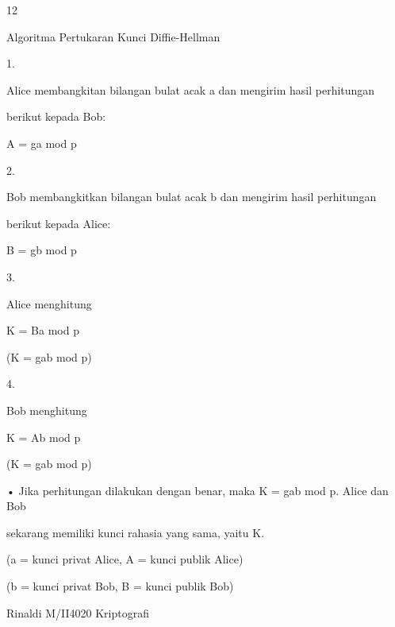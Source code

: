 \documentclass{article}
\begin{document}

12

Algoritma Pertukaran Kunci Diffie-Hellman

1.

Alice membangkitan bilangan bulat acak a  dan mengirim hasil perhitungan 

berikut kepada Bob:



A = ga mod p

2.

Bob membangkitkan bilangan bulat acak b dan mengirim hasil perhitungan 

berikut kepada Alice:



B = gb mod p

3.

Alice menghitung



K = Ba mod p  


(K  = gab mod p)

4.

Bob menghitung



K = Ab mod p  


(K  = gab mod p)

• Jika perhitungan dilakukan dengan benar, maka  K = gab mod p. Alice dan Bob 

sekarang memiliki kunci rahasia yang sama, yaitu K.

(a = kunci privat Alice, A = kunci publik Alice) 

(b = kunci privat Bob, B = kunci publik Bob) 

Rinaldi M/II4020 Kriptografi
\end{document}
